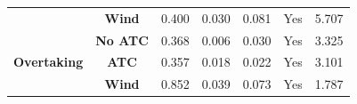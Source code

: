 \begin{table}
\begin{tabular}{ccccccc}
                                                                                                & \textbf{Wind}                   & 0.400                 & 0.030                 & 0.081                        & Yes                                                                                                   & 5.707                                                                                                    \\ 
\cline{2-7}
\multirow{3}{*}{\textbf{Overtaking}}                                                            & \textbf{No ATC}                 & 0.368            & 0.006            & 0.030                   & Yes                                                                                                & 3.325                                                                                               \\
                                                                                                & \textbf{ATC}                    & 0.357            & 0.018            & 0.022                   & Yes                                                                                                & 3.101                                                                                               \\
                                                                                                & \textbf{Wind}                   & 0.852            & 0.039            & 0.073                   & Yes                                                                                                & 1.787                                                                                               \\
\bottomrule
\end{tabular}
\end{table}
